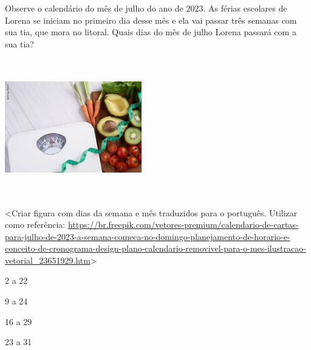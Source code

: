 \begin{escolha}
\begin{escolha}
{{{{{{{Observe o calendário do mês de julho do ano de 2023. As férias escolares
de Lorena se iniciam no primeiro dia desse mês e ela vai passar três
semanas com sua tia, que mora no litoral. Quais dias do mês de julho
Lorena passará com a sua tia?

\includegraphics[width=2.34444in,height=2.34933in]{media/image137.png}

\textless{}Criar figura com dias da semana e mês traduzidos para o
português. Utilizar como referência:
\url{https://br.freepik.com/vetores-premium/calendario-de-cartas-para-julho-de-2023-a-semana-comeca-no-domingo-planejamento-de-horario-e-conceito-de-cronograma-design-plano-calendario-removivel-para-o-mes-ilustracao-vetorial_23651929.htm}\textgreater{}

\begin{minipage}{.5\textwidth}
\begin{escolha}
\item 2 a 22

\item 9 a 24

\item 16 a 29

\item 23 a 31
\end{escolha}
\end{minipage}
}}}}}}}
\end{escolha}
\end{escolha}
